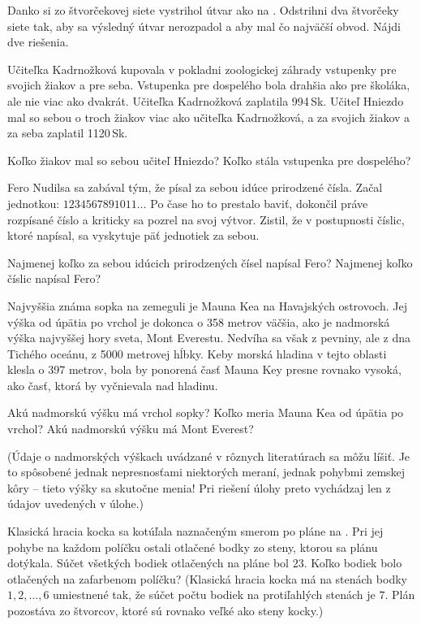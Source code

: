 {%
Danko si zo štvorčekovej siete vystrihol útvar ako na \obr{}.
Odstrihni dva štvorčeky siete tak, aby sa
výsledný útvar nerozpadol a aby mal čo
najväčší obvod.
Nájdi dve riešenia.
%
}

{%
Učiteľka Kadrnožková kupovala v pokladni zoologickej záhrady vstupenky pre svojich
žiakov a pre seba. Vstupenka pre dospelého bola drahšia ako pre školáka, ale nie viac ako
dvakrát. Učiteľka Kadrnožková zaplatila 994\,Sk. Učiteľ Hniezdo mal so sebou o troch žiakov
viac ako učiteľka Kadrnožková, a za svojich žiakov a za seba zaplatil 1120\,Sk.
\begin{itemize}
 Koľko žiakov mal so sebou učiteľ Hniezdo?
 Koľko stála vstupenka pre dospelého?
\end{itemize}
}

{%
Fero Nudilsa sa zabával tým, že písal za sebou idúce prirodzené čísla. Začal
jednotkou: $1234567891011\dots$ Po čase ho to prestalo baviť, dokončil práve rozpísané
číslo a kriticky sa pozrel na svoj výtvor. Zistil, že v postupnosti číslic, ktoré napísal, sa
vyskytuje päť jednotiek za sebou.
\begin{itemize}
 Najmenej koľko za sebou idúcich prirodzených čísel napísal Fero?
 Najmenej koľko číslic napísal Fero?
\end{itemize}
}

{%
Najvyššia známa sopka na zemeguli je Mauna Kea na Havajských ostrovoch. Jej
výška od úpätia po vrchol je dokonca o 358 metrov väčšia, ako je nadmorská výška
najvyššej hory sveta, Mont Everestu. Nedvíha sa však z pevniny, ale z dna Tichého
oceánu, z 5000 metrovej hĺbky. Keby morská hladina v tejto oblasti klesla o 397
metrov, bola by ponorená časť Mauna Key presne rovnako vysoká, ako časť, ktorá by
vyčnievala nad hladinu.
\begin{itemize}
 Akú nadmorskú výšku má vrchol sopky?
 Koľko meria Mauna Kea od úpätia po vrchol?
 Akú nadmorskú výšku má Mont Everest?
\end{itemize}
\noindent(Údaje o nadmorských výškach uvádzané v rôznych literatúrach sa môžu líšiť. Je to
spôsobené jednak nepresnosťami niektorých meraní, jednak pohybmi zemskej kôry --
tieto výšky sa skutočne menia! Pri riešení úlohy preto vychádzaj len z údajov
uvedených v úlohe.)}

{%
Klasická hracia kocka sa kotúľala naznačeným smerom po pláne
na \obr. Pri jej pohybe na každom políčku ostali otlačené
bodky zo steny, ktorou sa plánu dotýkala. Súčet všetkých bodiek
otlačených na pláne bol $23$. Koľko bodiek bolo otlačených na
zafarbenom políčku?
(Klasická hracia kocka má na stenách bodky $1,2,\dots,6$
umiestnené tak, že súčet počtu bodiek na protiľahlých stenách je
$7$. Plán pozostáva zo štvorcov, ktoré sú rovnako veľké ako steny
kocky.)
%
}


